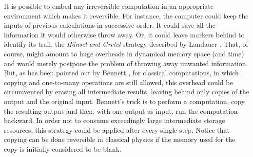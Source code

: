\documentclass[pra,amsfonts,twocolumn]{revtex4}
\begin{document}
It is possible to embed any irreversible computation in an appropriate
environment which makes it reversible. For instance, the computer
could keep the inputs of previous calculations in successive order.
It could save all the information it would otherwise throw away.
 Or,
it could leave markers behind to identify its trail, the {\it H\"ansel
and Gretel} strategy described by Landauer \cite{landauer-94}. That, of
course, might amount to huge overheads in dynamical memory space
(and time) and would merely postpone the problem of throwing away
unwanted information. But, as has been pointed out by Bennett
\cite{bennett-73}, for classical computations, in which copying and
one-to-many operations are still allowed, this overhead could be
circumvented by
erasing all intermediate results, leaving behind only copies of the
output and the original input. Bennett's trick is
to perform  a computation,  copy the resulting output
and then, with one output as input, run
the computation backward. In order not to consume exceedingly large
intermediate storage resources, this strategy could be applied after
every single step.
Notice that copying can be done
reversible in classical physics if the memory used for the copy is
initially considered to be blank.
\end{document}
